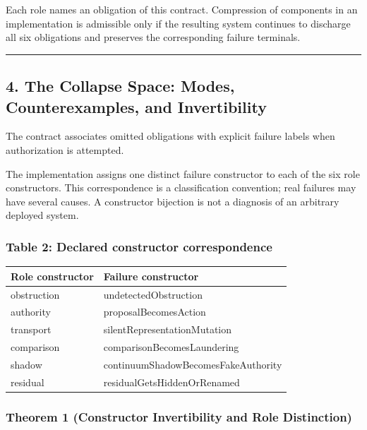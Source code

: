 \documentclass[
  10pt,
]{article}
\begin{document}
Each role names an obligation of this contract. Compression of components in an implementation is admissible only if the resulting system continues to discharge all six obligations and preserves the corresponding failure terminals.

\begin{center}\rule{0.5\linewidth}{0.5pt}\end{center}

\subsection{4. The Collapse Space: Modes, Counterexamples, and Invertibility}\label{the-collapse-space-modes-counterexamples-and-invertibility}

The contract associates omitted obligations with explicit failure labels when authorization is attempted.

The implementation assigns one distinct failure constructor to each of the six role constructors. This correspondence is a classification convention; real failures may have several causes. A constructor bijection is not a diagnosis of an arbitrary deployed system.

\subsubsection{Table 2: Declared constructor correspondence}\label{table-2-declared-constructor-correspondence}

\begin{longtable}[]{@{}ll@{}}
\toprule\noalign{}
Role constructor & Failure constructor \\
\midrule\noalign{}
\endhead
\bottomrule\noalign{}
\endlastfoot
obstruction & undetectedObstruction \\
authority & proposalBecomesAction \\
transport & silentRepresentationMutation \\
comparison & comparisonBecomesLaundering \\
shadow & continuumShadowBecomesFakeAuthority \\
residual & residualGetsHiddenOrRenamed \\
\end{longtable}

\subsubsection{Theorem 1 (Constructor Invertibility and Role Distinction)}\label{theorem-1-constructor-invertibility-and-role-distinction}
\end{document}
